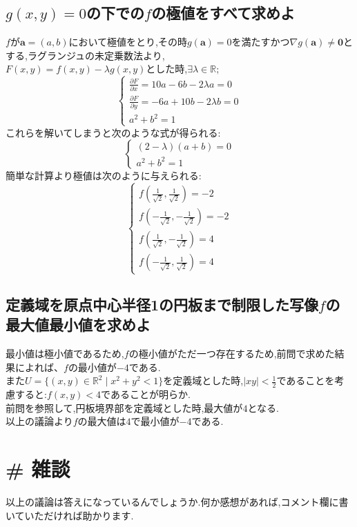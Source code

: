 \documentclass[dvipdfmx]{jsarticle}
\begin{document}
\subsection{$g(x,y)=0$の下での$f$の極値をすべて求めよ}
$f$が$\bm{a}=(a,b)$において極値をとり,その時$g(\bm{a}) =0$を満たすかつ$\nabla g(\bm{a}) \ne \bm{0}$とする,ラグランジュの未定乗数法より,\\
$F(x,y) = f(x,y) - \lambda g(x,y)$とした時,$\exists \lambda \in \mathbb{R};$
$$
\begin{cases}
	\frac{\partial F}{\partial x} = 10 a -6b -2\lambda a =0\\
	\frac{\partial F}{\partial y} = -6a +10 b -2 \lambda b =0\\
	a^2+b^2=1
\end{cases}
$$
これらを解いてしまうと次のような式が得られる:
$$
\begin{cases}
	(2- \lambda )(a+b)=0\\
	a^2 +b^2 =1
\end{cases}
$$
簡単な計算より極値は次のように与えられる:\\
$$
\begin{cases}
	f( \frac{1}{\sqrt{2}}, \frac{1}{\sqrt{2}}) = -2 \\
	f(-\frac{1}{\sqrt{2}},-\frac{1}{\sqrt{2}}) = -2 \\
	f( \frac{1}{\sqrt{2}},-\frac{1}{\sqrt{2}}) =  4 \\
	f(-\frac{1}{\sqrt{2}}, \frac{1}{\sqrt{2}}) =  4   
\end{cases}
$$
\subsection{定義域を原点中心半径1の円板まで制限した写像$f$の最大値最小値を求めよ}
最小値は極小値であるため,$f$の極小値がただ一つ存在するため,前問で求めた結果によれば、$f$の最小値が$-4$である.\\
また$U = \{(x,y) \in \mathbb{R}^2 \mid x^2 + y^2 <1 \}$を定義域とした時,$|xy|<\frac{1}{2}$であることを考慮すると:$f(x,y)<4$であることが明らか.\\
前問を参照して,円板境界部を定義域とした時,最大値が$4$となる.\\
以上の議論より$f$の最大値は$4$で最小値が$-4$である.\\
\newpage
\section{\# 雑談}
以上の議論は答えになっているんでしょうか.何か感想があれば,コメント欄に書いていただければ助かります.
\end{document}
